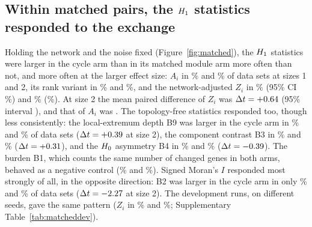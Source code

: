 \begin{table}[t]
\centering\small
\caption{Matched cycle--module experiment, verification seeds (\decOneN{} data sets per size). Paired: share of data sets in which the statistic was larger in the cycle arm than in the module arm built from the same noise on the same subnetwork, with exact 95\% confidence intervals; there were \pairTies{} ties. $\Delta t$: mean paired difference $t_{\mathrm{cycle}}-t_{\mathrm{module}}$. AUC: $P(t_{\mathrm{cycle}}>t_{\mathrm{module}})$ over all pairs of data sets, ties counted one half; values below 0.5 mean the statistic is larger in the module arm. Size: change in units of the noise standard deviation.}
\label{tab:matched}
{\footnotesize\setlength{\tabcolsep}{4pt}}
\end{table}

\subsection{Within matched pairs, the $H_{1}$ statistics responded to the exchange}\label{sec:res-signal}
Holding the network and the noise fixed (Figure~\ref{fig:matched}), the $H_{1}$ statistics were larger in the cycle arm than in its matched module arm more often than not, and more often at the larger effect size: $A_i$ in \pairAOne\% and \pairATwo\% of data sets at sizes 1 and 2, its rank variant in \pairArankOne\% and \pairArankTwo\%, and the network-adjusted $Z_i$ in \pairZOne\% (95\% CI \pairZOneci\%) and \pairZTwo\% (\pairZTwoci\%). At size 2 the mean paired difference of $Z_i$ was $\Delta t=+0.64$ (95\% interval \dtciZTwo), and that of $A_i$ was \dtATwo. The topology-free statistics responded too, though less consistently: the local-extremum depth B9 was larger in the cycle arm in \pairBnineOne\% and \pairBnineTwo\% of data sets ($\Delta t=+0.39$ at size 2), the component contrast B3 in \pairBthreeOne\% and \pairBthreeTwo\% ($\Delta t=+0.31$), and the $H_{0}$ asymmetry B4 in \pairBfourOne\% and \pairBfourTwo\% ($\Delta t=-0.39$). The burden B1, which counts the same number of changed genes in both arms, behaved as a negative control (\pairBoneOne\% and \pairBoneTwo\%). Signed Moran's $I$ responded most strongly of all, in the opposite direction: B2 was larger in the cycle arm in only \pairBtwoOne\% and \pairBtwoTwo\% of data sets ($\Delta t=-2.27$ at size 2). The development runs, on different seeds, gave the same pattern ($Z_i$ in \devpairZOne\% and \devpairZTwo\%; Supplementary Table~\ref{tab:matcheddev}).

